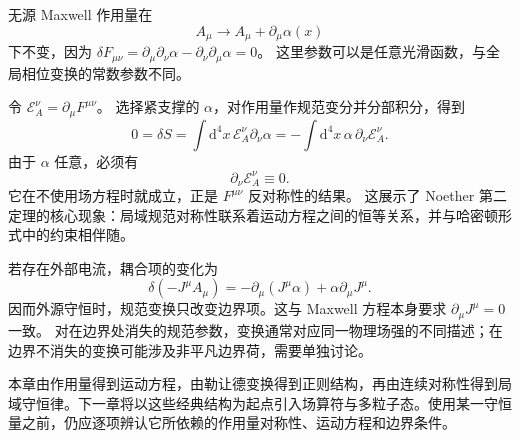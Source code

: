 无源 Maxwell 作用量在
\begin{equation}
  A_{\mu}\longrightarrow A_{\mu}+\partial_{\mu}\alpha(x)
\end{equation}
下不变，因为
$\delta F_{\mu\nu}=\partial_{\mu}\partial_{\nu}\alpha
-\partial_{\nu}\partial_{\mu}\alpha=0$。
这里参数可以是任意光滑函数，与全局相位变换的常数参数不同。

令 $\mathcal{E}_{A}^{\nu}=\partial_{\mu}F^{\mu\nu}$。
选择紧支撑的 $\alpha$，对作用量作规范变分并分部积分，得到
\begin{equation}
  0=\delta S=\int\mathrm{d}^{4}x\,
  \mathcal{E}_{A}^{\nu}\partial_{\nu}\alpha
  =-\int\mathrm{d}^{4}x\,\alpha\,\partial_{\nu}\mathcal{E}_{A}^{\nu}.
\end{equation}
由于 $\alpha$ 任意，必须有
\begin{equation}
  \partial_{\nu}\mathcal{E}_{A}^{\nu}\equiv0.
\end{equation}
它在不使用场方程时就成立，正是 $F^{\mu\nu}$ 反对称性的结果。
这展示了 Noether 第二定理的核心现象：局域规范对称性联系着运动方程之间的恒等关系，并与哈密顿形式中的约束相伴随。

若存在外部电流，耦合项的变化为
\begin{equation}
  \delta(-J^{\mu}A_{\mu})
  =-\partial_{\mu}(J^{\mu}\alpha)+\alpha\partial_{\mu}J^{\mu}.
\end{equation}
因而外源守恒时，规范变换只改变边界项。这与 Maxwell 方程本身要求
$\partial_{\mu}J^{\mu}=0$ 一致。
对在边界处消失的规范参数，变换通常对应同一物理场强的不同描述；在边界不消失的变换可能涉及非平凡边界荷，需要单独讨论。

本章由作用量得到运动方程，由勒让德变换得到正则结构，再由连续对称性得到局域守恒律。下一章将以这些经典结构为起点引入场算符与多粒子态。使用某一守恒量之前，仍应逐项辨认它所依赖的作用量对称性、运动方程和边界条件。
